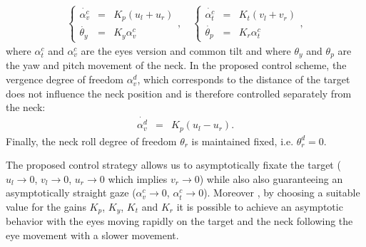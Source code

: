 \begin{eqnarray} \label{Eq:HeadEyeControl}
\left\{\begin{matrix}
\dot {\alpha_v^c} &=&   K_p (u_l + u_r)\\
\dot {\theta_y} &=&   K_y \alpha_v^c 
\end{matrix}
\right.,\quad
\left\{ \begin{matrix}
\dot {\alpha_t^c} &=&   K_t (v_l + v_r)\\
\dot {\theta_p} &=&   K_r \alpha_t^c
\end{matrix} \right.,
\end{eqnarray}
%
where $\alpha_t^c$ and $\alpha_v^c$ are the eyes version and common tilt and 
where $\theta_y$ and $\theta_p$ are the yaw and pitch movement of the neck. 
In the proposed control scheme, the vergence degree of freedom $\alpha_v^d$, 
which corresponds to the distance of the target does not influence 
the neck position and is therefore controlled separately from the neck:
\begin{eqnarray} 
\dot {\alpha_v^d} &=&   K_p (u_l - u_r).
\end{eqnarray}
Finally, the neck roll degree of freedom $\theta_r$ is maintained fixed, 
i.e. $\theta_r^d=0$.

The proposed control strategy allows us to asymptotically fixate the target 
($u_l \rightarrow 0$, $v_l \rightarrow 0$, $u_r \rightarrow 0$ which 
implies $v_r \rightarrow 0$) while also also guaranteeing an asymptotically 
straight gaze ($\alpha_v^c \rightarrow 0$, $\alpha_t^c \rightarrow 0$). Moreover
, by choosing a suitable value for the gains $K_p$, $K_y$, $K_t$ and $K_r$ it
is possible to achieve an asymptotic behavior with the eyes moving rapidly on 
the target and the neck following the eye movement with a slower 
movement.
